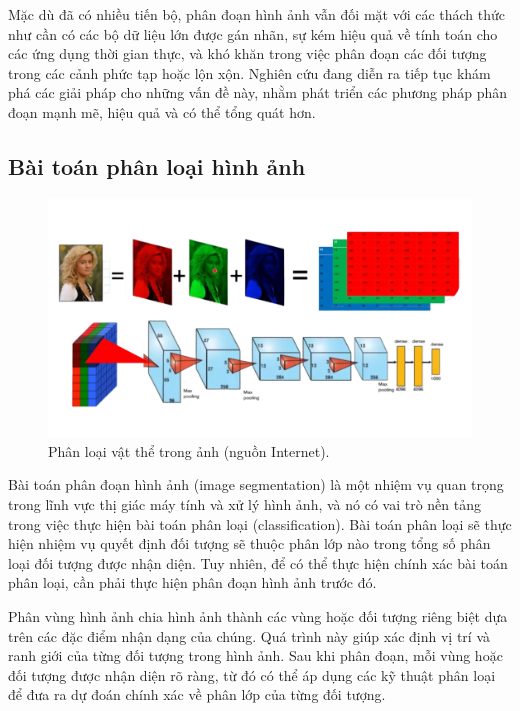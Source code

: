 Mặc dù đã có nhiều tiến bộ, phân đoạn hình ảnh vẫn đối mặt với các thách thức như cần có các bộ dữ liệu lớn được gán nhãn, sự kém hiệu quả về tính toán cho các ứng dụng thời gian thực, và khó khăn trong việc phân đoạn các đối tượng trong các cảnh phức tạp hoặc lộn xộn. Nghiên cứu đang diễn ra tiếp tục khám phá các giải pháp cho những vấn đề này, nhằm phát triển các phương pháp phân đoạn mạnh mẽ, hiệu quả và có thể tổng quát hơn.

\subsection{Bài toán phân loại hình ảnh}

\begin{figure}[h]
	\centering
	\includegraphics[width=120mm]{fig/classificationimg.png}
        \captionsetup{justification=centering}
	\caption{Phân loại vật thể trong ảnh (nguồn Internet).}
	\label{fig_DlandML}
\end{figure}

Bài toán phân đoạn hình ảnh (image segmentation) là một nhiệm vụ quan trọng trong lĩnh vực thị giác máy tính và xử lý hình ảnh, và nó có vai trò nền tảng trong việc thực hiện bài toán phân loại (classification). Bài toán phân loại sẽ thực hiện nhiệm vụ quyết định đối tượng sẽ thuộc phân lớp nào trong tổng số phân loại đối tượng được nhận diện. Tuy nhiên, để có thể thực hiện chính xác bài toán phân loại, cần phải thực hiện phân đoạn hình ảnh trước đó. 

Phân vùng hình ảnh chia hình ảnh thành các vùng hoặc đối tượng riêng biệt dựa trên các đặc điểm nhận dạng của chúng. Quá trình này giúp xác định vị trí và ranh giới của từng đối tượng trong hình ảnh. Sau khi phân đoạn, mỗi vùng hoặc đối tượng được nhận diện rõ ràng, từ đó có thể áp dụng các kỹ thuật phân loại để đưa ra dự đoán chính xác về phân lớp của từng đối tượng.


